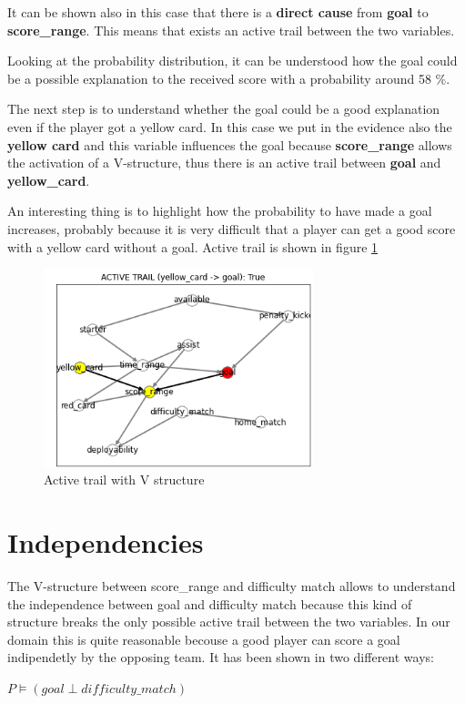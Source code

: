 \documentclass[a4paper,10pt]{report}
\begin{document}
It can be shown also in this case that there is a \textbf{direct cause} from \textbf{goal} to \textbf{score_range}. This means that exists an active trail between the two variables.

Looking at the probability distribution, it can be understood how the goal could be a possible explanation to the received score with a probability around 58 \%.

The next step is to understand whether the goal could be a good explanation even if the player got a yellow card. In this case we put in the evidence also the \textbf{yellow card} and this variable influences the goal because \textbf{score_range} allows the activation of a V-structure, thus there is an active trail between \textbf{goal} and \textbf{yellow_card}.

An interesting thing is to highlight how the probability to have made a goal increases, probably because it is very difficult that a player can get a good score with a yellow card without a goal.
Active trail is shown in figure \ref{fig:active_with_V_structure}

\begin{figure}[h]
    \centering
    \includegraphics[width=0.70\textwidth]{assets/img/active_trail_3.PNG}
    \caption{Active trail with V structure}
    \label{fig:active_with_V_structure}
\end{figure}


\section{Independencies}\label{sec:section-43}

The V-structure between score_range and difficulty match allows to understand the independence between goal and difficulty match because this kind of structure breaks the only possible active trail between the two variables. In our domain this is quite reasonable becouse a good player can score a goal indipendetly by the opposing team. It has been shown in two different ways:
\begin{center}
    $P \models (goal \perp difficulty\_match)$
\end{center}
\end{document}
